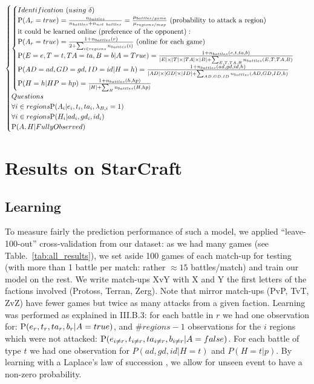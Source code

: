 \begin{eqnarray*}
\begin{cases}
\begin{cases}
    Identification\ (using\ \delta)\\
\PP(A_r=true)= \frac{n_{battles}}{n_{battles}+n_{not\ battles}} = \frac{\mu_{battles/game}}{\mu_{regions/map}}\ \mathrm{(probability\ to\ attack\ a\ region)}\\
\mathrm{it\ could\ be\ learned\ online\ (preference\ of\ the\ opponent):}\\
\PP(A_r=true) = \frac{1 + n_{battles}(r)}{2 + \sum_{i \in regions}n_{battles}(i)}\ \mathrm{(online\ for\ each\ game)}\\
\PP(E=e,T=t,TA=ta,B=b|A=True) = \frac{1+n_{battles}(e,t,ta,b)}{\abs{E} \times \abs{T} \times \abs{TA} \times \abs{B} + \sum_{E,T,TA,B} n_{battles}(E,T,TA,B)} \\
\PP(AD=ad,GD=gd,ID=id|H=h) = \frac{1+n_{battles}(ad,gd,id,h)}{\abs{AD} \times \abs{GD} \times \abs{ID} + \sum_{AD,GD,ID} n_{battles}(AD,GD,ID,h)} \\
\PP(H=h|HP=hp) = \frac{1 + n_{battles}(h,hp)}{\abs{H} + \sum_{H} n_{battles}(H,hp)}\\
    \end{cases}\\
Questions\\
\forall i \in regions \PP(A_i|e_i,t_i,ta_i,\lambda_{B,i}=1)\\
\forall i \in regions \PP(H_i|ad_i,gd_i,id_i) \\
\PP(A,H|FullyObserved)\\
\end{cases}
\label{bp:BayesianTactician}
\end{eqnarray*}


\section{Results on StarCraft}

\subsection{Learning}
To measure fairly the prediction performance of such a model, we applied ``leave-100-out'' cross-validation from our dataset: as we had many games (see Table.~\ref{tab:all_results}), we set aside 100 games of each match-up for testing (with more than 1 battle per match: rather $\approx 15$ battles/match) and train our model on the rest. We write match-ups XvY with X and Y the first letters of the factions involved (Protoss, Terran, Zerg). Note that mirror match-ups (PvP, TvT, ZvZ) have fewer games but twice as many attacks from a given faction. Learning was performed as explained in III.B.3: for each battle in $r$ we had one observation for: $\mathrm{P}(e_r,t_r,ta_r,b_r|A=true)$, and $\#regions-1$ observations for the $i$ regions which were not attacked: $\mathrm{P}(e_{i \neq r},t_{i \neq r}, ta_{i \neq r}, b_{i \neq r}|A=false)$. For each battle of type $t$ we had one observation for $P(ad,gd,id|H=t)$ and $P(H=t|p)$. By learning with a Laplace's law of succession \cite{Jaynes}, we allow for unseen event to have a non-zero probability.

